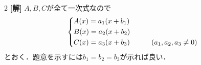 \documentclass[../../../../main.tex]{subfiles}
\begin{document}
\setcounter{equation}{0}
\begin{oframed}
    
\end{oframed}
\setlength{\columnseprule}{0.4pt}
\begin{multicols}{2}
    {\bf[解]}
    $A,B,C$が全て一次式なので
    \begin{align*}
        \begin{dcases}
            A(x) = a_1(x + b_1)                                 \\
            B(x) = a_2(x + b_2)                                 \\
            C(x) = a_3(x + b_3) & \qquad (a_1, a_2, a_3 \neq 0)
        \end{dcases}
    \end{align*}
    とおく．題意を示すには$b_1=b_2=b_3$が示れば良い．


\end{multicols}
\end{document}
